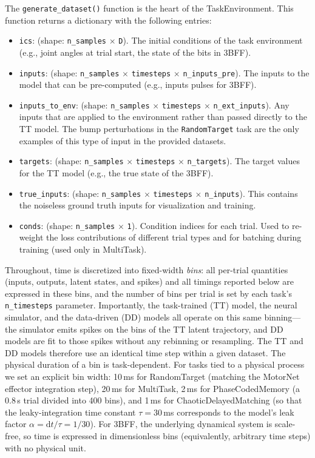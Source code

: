\documentclass{article}
\begin{document}
The \texttt{generate\_dataset()} function is the heart of the TaskEnvironment. This function returns a dictionary with the following entries:
 \begin{itemize}
        \item \texttt{ics}: (shape: \texttt{n\_samples} $\times$ \texttt{D}). The initial conditions of the task environment (e.g., joint angles at trial start, the state of the bits in 3BFF).
        \item \texttt{inputs}: (shape: \texttt{n\_samples} $\times$ \texttt{timesteps} $\times$ \texttt{n\_inputs\_pre}). The inputs to the model that can be pre-computed (e.g., inputs pulses for 3BFF).
        \item \texttt{inputs\_to\_env}: (shape: \texttt{n\_samples} $\times$ \texttt{timesteps} $\times$ \texttt{n\_ext\_inputs}). Any inputs that are applied to the environment rather than passed directly to the TT model. The bump perturbations in the \texttt{RandomTarget} task are the only examples of this type of input in the provided datasets.
        \item \texttt{targets}: (shape: \texttt{n\_samples} $\times$ \texttt{timesteps} $\times$ \texttt{n\_targets}). The target values for the TT model (e.g., the true state of the 3BFF).
        \item \texttt{true\_inputs}: (shape: \texttt{n\_samples} $\times$ \texttt{timesteps} $\times$ \texttt{n\_inputs}). This contains the noiseless ground truth inputs for visualization and training.
        \item \texttt{conds}: (shape: \texttt{n\_samples} $\times$ \texttt{1}). Condition indices for each trial. Used to re-weight the loss contributions of different trial types and for batching during training (used only in MultiTask).
    \end{itemize}


Throughout, time is discretized into fixed-width \textit{bins}: all per-trial quantities (inputs, outputs, latent states, and spikes) and all timings reported below are expressed in these bins, and the number of bins per trial is set by each task's \texttt{n\_timesteps} parameter. Importantly, the task-trained (TT) model, the neural simulator, and the data-driven (DD) models all operate on this same binning---the simulator emits spikes on the bins of the TT latent trajectory, and DD models are fit to those spikes without any rebinning or resampling. The TT and DD models therefore use an identical time step within a given dataset. The physical duration of a bin is task-dependent. For tasks tied to a physical process we set an explicit bin width: 10\,ms for RandomTarget (matching the MotorNet effector integration step), 20\,ms for MultiTask, 2\,ms for PhaseCodedMemory (a $0.8$\,s trial divided into 400 bins), and 1\,ms for ChaoticDelayedMatching (so that the leaky-integration time constant $\tau = 30$\,ms corresponds to the model's leak factor $\alpha = \mathrm{d}t/\tau = 1/30$). For 3BFF, the underlying dynamical system is scale-free, so time is expressed in dimensionless bins (equivalently, arbitrary time steps) with no physical unit.
\end{document}
